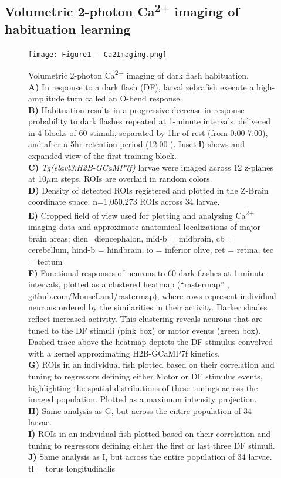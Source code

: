 \documentclass[9pt,lineno]{RandlettLab_elife}
\begin{document}
\subsection{Volumetric 2-photon Ca\textsuperscript{2+} imaging of habituation learning}
\vspace{3mm}

\begin{figure}
\begin{fullwidth}
\begin{center}
\texttt{[image: Figure1 - Ca2Imaging.png]}
\caption{Volumetric 2-photon Ca\textsuperscript{2+} imaging of dark flash habituation.
\\ \textbf{A)} In response to a dark flash (DF), larval zebrafish execute a high-amplitude turn called an O-bend response.
\\ \textbf{B)} Habituation results in a progressive decrease in response probability to dark flashes repeated at 1-minute intervals, delivered in 4 blocks of 60 stimuli, separated by 1hr of rest (from 0:00-7:00), and after a 5hr retention period (12:00-). Inset \textbf{i)} shows and expanded view of the first training block.  
\\ \textbf{C)} \textit{Tg(elavl3:H2B-GCaMP7f)} larvae were imaged across 12 z-planes at 10$\mu$m steps. ROIs are overlaid in random colors. 
\\ \textbf{D)} Density of detected ROIs registered and plotted in the Z-Brain coordinate space. n=1,050,273 ROIs across 34 larvae. 
\\ \textbf{E)} Cropped field of view used for  plotting and analyzing Ca\textsuperscript{2+} imaging data and approximate anatomical localizations of major brain areas: dien=diencephalon, mid-b = midbrain, cb = cerebellum, hind-b = hindbrain, io = inferior olive, ret = retina, tec = tectum
\\ \textbf{F)} Functional responses of neurons to 60 dark flashes at 1-minute intervals, plotted as a clustered heatmap (“rastermap” \citep{Pachitariu2017-ad}, \href{https://github.com/MouseLand/rastermap}{github.com/MouseLand/rastermap}), where rows represent individual neurons ordered by the similarities in their activity. Darker shades reflect increased activity. This clustering reveals neurons that are tuned to the DF stimuli (pink box) or motor events (green box). Dashed trace above the heatmap depicts the DF stimulus convolved with a kernel approximating H2B-GCaMP7f kinetics.
\\ \textbf{G)} ROIs in an individual fish plotted based on their correlation and tuning to regressors defining either Motor or DF stimulus events, highlighting the spatial distributions of these tunings across the imaged population. Plotted as a maximum intensity projection. 
\\ \textbf{H)} Same analysis as G, but across the entire population of 34 larvae. 
\\ \textbf{I)} ROIs in an individual fish plotted based on their correlation and tuning to regressors defining either the first or last three DF stimuli. 
\\ \textbf{J)} Same analysis as I, but across the entire population of 34 larvae. tl = torus longitudinalis
}


\end{center}
\end{fullwidth}
\end{figure}
\end{document}
